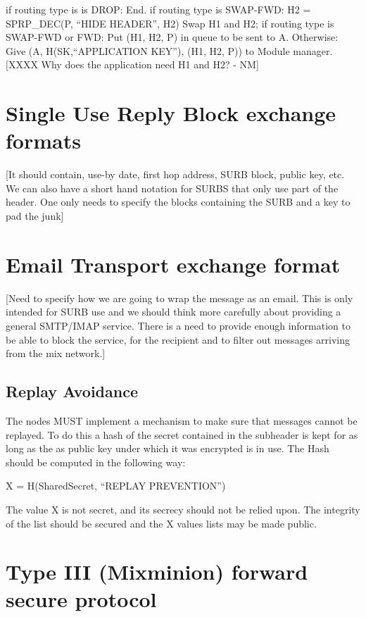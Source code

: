 	if routing type is is DROP:
                End.
	if routing type is SWAP-FWD:
		H2 = SPRP_DEC(P, ``HIDE HEADER'', H2)
		Swap H1 and H2;
        if routing type is SWAP-FWD or FWD:
	   	Put (H1, H2, P) in queue to be sent to A.
        Otherwise:
		Give (A, H(SK,``APPLICATION KEY''), (H1, H2, P)) to
		Module manager. 
                  [XXXX Why does the application need H1 and H2? - NM]

\section{Single Use Reply Block exchange formats}

[It should contain, use-by date, first hop address, 
 SURB block, public key, etc.
 We can also have a short hand notation for SURBS that only
 use part of the header. One only needs to specify the 
 blocks containing the SURB and a key to pad the junk]

\section{Email Transport exchange format}

[Need to specify how we are going to wrap the message
 as an email. This is only intended for SURB use and
 we should think more carefully about providing a 
 general SMTP/IMAP service.
 There is a need to provide enough information to be 
 able to block the service, for the recipient and to
 filter out messages arriving from the mix network.]

\subsection{Replay Avoidance}

The nodes MUST implement a mechanism to make sure that messages cannot
be replayed. To do this a hash of the secret contained in the
subheader is kept for as long as the as public key under which it was
encrypted is in use. The Hash should be computed in the following way:

X = H(SharedSecret, ``REPLAY PREVENTION'')

The value X is not secret, and its secrecy should not be relied upon.
The integrity of the list should be secured and the X values lists may
be made public.

\section{Type III (Mixminion) forward secure protocol}


